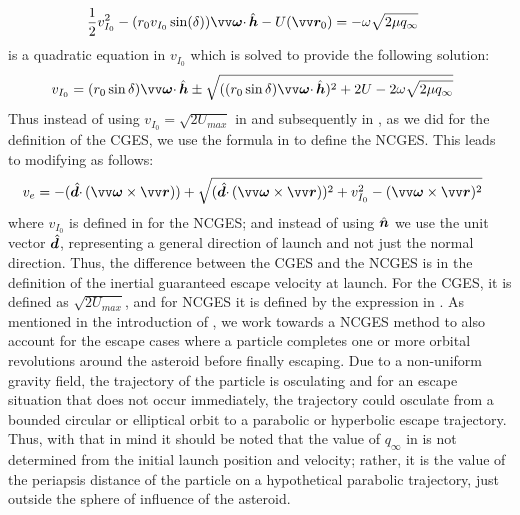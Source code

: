 \begin{align}
    \frac{1}{2} v_{I_0}^2 - (r_0 v_{I_0} \sin(\delta)) \bv{\omega}\cdotp\buv{h} - U(\bv{r}_0) &= -\omega \sqrt{2\mu q_{\infty}}
    \label{eqn:jacobian_equate_equatorial_mod}
\end{align}
 is a quadratic equation in $v_{I_0}$ which is solved to provide the following solution:
\begin{align}
    v_{I_0} &= (r_0 \sin\delta) \bv{\omega}\cdotp\buv{h} \pm \sqrt{((r_0 \sin\delta)\bv{\omega}\cdotp\buv{h})^2 + 2U - 2\omega\sqrt{2\mu q_\infty}}
    \label{eqn:non_conservative_inertial_guaranteed_escape_speed}
\end{align}
Thus instead of using $v_{I_0} = \sqrt{2U_{max}}$ in  and subsequently in , as we did for the definition of the \gls{CGES}, we use the formula in  to define the \gls{NCGES}. This leads to modifying  as follows:
\begin{align}
    v_e &= -(\buv{d} \cdotp (\bv{\omega} \times \bv{r})) + \sqrt{(\buv{d} \cdotp (\bv{\omega} \times \bv{r}))^2 + v_{I_0}^2 - (\bv{\omega} \times {\bv{r}})^2}
    \label{eqn:nonconservative_escape_speed}
\end{align}
where $v_{I_0}$ is defined in  for the \gls{NCGES}; and instead of using $\hat{\bm{n}}$ we use the unit vector $\hat{\bm{d}}$, representing a general direction of launch and not just the normal direction.
%
\newline\newline
%
Thus, the difference between the \gls{CGES} and the \gls{NCGES} is in the definition of the inertial guaranteed escape velocity at launch. For the \gls{CGES}, it is defined as $\sqrt{2U_{max}}$, and for \gls{NCGES} it is defined by the expression in . As mentioned in the introduction of , we work towards a \gls{NCGES} method to also account for the escape cases where a particle completes one or more orbital revolutions around the asteroid before finally escaping. Due to a non-uniform gravity field, the trajectory of the particle is osculating and for an escape situation that does not occur immediately, the trajectory could osculate from a bounded circular or elliptical orbit to a parabolic or hyperbolic escape trajectory. Thus, with that in mind it should be noted that the value of $q_\infty$ in  is not determined from the initial launch position and velocity; rather, it is the value of the periapsis distance of the particle on a hypothetical parabolic trajectory, just outside the sphere of influence of the asteroid.
